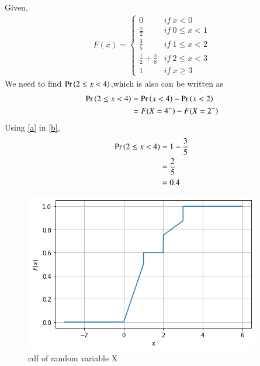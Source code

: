 
Given,
\begin{align}
F(x)= \begin{cases} 
       0  & if \:x<0\\
       \frac{x}{2} & if\: 0 \le x <1\\
       \frac{3}{5} & if \:1 \le x <2\\
       \frac{1}{2} +\frac{x}{8} & if\: 2\le x <3\\
       1  & if\: x\ge 3
    \end{cases} \label{a}
\end{align}
We need to find $\Pr\left(2\le x <4\right)$,which is also can be written as
\begin{align}
\Pr\left(2\le x <4\right) &= \Pr\left(x<4\right) - \Pr\left( x <2\right)\\
              &= F(X=4^{-}) - F(X=2^{-})\label{b}
 \end{align} 
 Using \eqref{a} in \eqref{b},
 \begin{align}
 \Pr\left(2\le x <4\right) &= 1 - \frac{3}{5}\\
                &= \frac{2}{5}\\
                &= 0.4 
\end{align} 


\begin{figure}[ht]
    \centering
    \includegraphics[width=\columnwidth]{solutions/ma/2015/9/Fig_assign_5.png}
    \caption{cdf of random variable X}
\end{figure}
